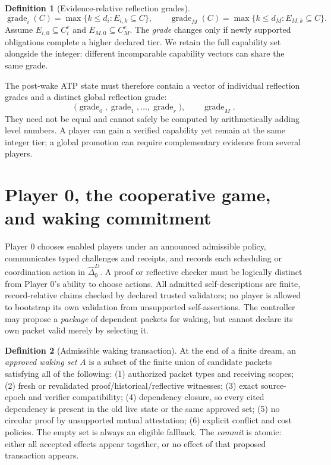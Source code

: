 \documentclass[11pt,letterpaper]{article}
\theoremstyle{definition}
\newtheorem{definition}{Definition}[section]
\theoremstyle{plain}
\theoremstyle{definition}
\newcommand{\Grade}{\operatorname{grade}}
\begin{document}
\begin{definition}[Evidence-relative reflection grades]
\[
 \Grade_i(C)=\max\{k\le d_i:E_{i,k}\subseteq C\},\qquad
 \Grade_M(C)=\max\{k\le d_M:E_{M,k}\subseteq C\}.
\]
Assume $E_{i,0}\subseteq C_i^e$ and $E_{M,0}\subseteq C_M^e$. The \emph{grade} changes only if newly supported obligations complete a higher declared tier. We retain the full capability set alongside the integer: different incomparable capability vectors can share the same grade.
\end{definition}

The post-wake ATP state must therefore contain a vector of individual reflection grades and a distinct global reflection grade:\[\big(\Grade_0,\Grade_1,\ldots,\Grade_r\big),\qquad\Grade_M.\] They need not be equal and cannot safely be computed by arithmetically adding level numbers. A player can gain a verified capability yet remain at the same integer tier; a global promotion can require complementary evidence from several players.

\section{Player 0, the cooperative game, and waking commitment}\label{gl-first-W0-s10}
Player 0 chooses enabled players under an announced admissible policy, communicates typed challenges and receipts, and records each scheduling or coordination action in $\widehat\Delta_0^D$. A proof or reflective checker must be logically distinct from Player 0's ability to choose actions. All admitted self-descriptions are finite, record-relative claims checked by declared trusted validators; no player is allowed to bootstrap its own validation from unsupported self-assertions. The controller may propose a \emph{package} of dependent packets for waking, but cannot declare its own packet valid merely by selecting it.

\begin{definition}[Admissible waking transaction]
At the end of a finite dream, an \emph{approved waking set} $A$ is a subset of the finite union of candidate packets satisfying all of the following: (1) authorized packet types and receiving scopes; (2) fresh or revalidated proof/historical/reflective witnesses; (3) exact source-epoch and verifier compatibility; (4) dependency closure, so every cited dependency is present in the old live state or the same approved set; (5) no circular proof by unsupported mutual attestation; (6) explicit conflict and cost policies. The empty set is always an eligible fallback. The \emph{commit} is atomic: either all accepted effects appear together, or no effect of that proposed transaction appears.
\end{definition}
\end{document}
